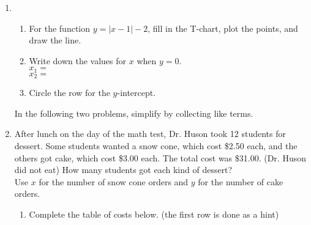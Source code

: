 \documentclass[12pt, oneside]{article}
\begin{document}
\begin{enumerate}
\newpage

\item
\begin{enumerate}
  \item For the function $y= |x-1|-2$, fill in the T-chart, plot the points, and draw the line.
    \begin{center} %
    \end{center}
    \item Write down the values for $x$ when $y=0$.\\[0.5cm]
    $x_1=$\\[0.5cm]
    $x_2=$\\[0.5cm]
    \item Circle the row for the $y$-intercept.
\end{enumerate}
\vspace{1cm}

In the following two problems, simplify by collecting like terms.

\newpage

  \item After lunch on the day of the math test, Dr. Huson took 12 students for dessert. Some students wanted a snow cone, which cost \$2.50 each, and the others got cake, which cost \$3.00 each. The total cost was \$31.00. (Dr. Huson did not eat) How many students got each kind of dessert? \\[0.5cm]
  Use $x$ for the number of snow cone orders and $y$ for the number of cake orders.
  \begin{enumerate}
    \item Complete the table of costs below. (the first row is done as a hint)


\end{enumerate}
\end{enumerate}
\end{document}
